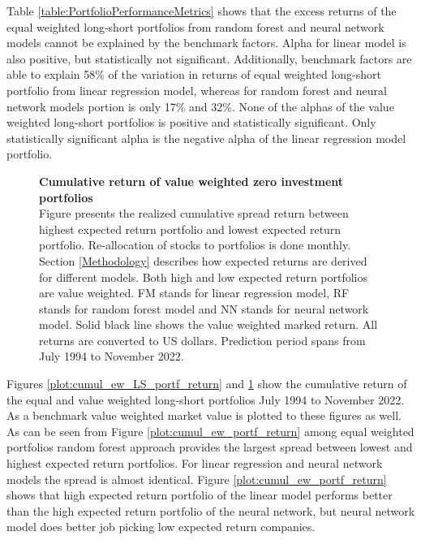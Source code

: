 \documentclass[12pt]{article}
\begin{document}
Table \ref{table:PortfolioPerformanceMetrics} shows that the excess returns of the equal weighted long-short portfolios from random forest and neural network models cannot be explained by the benchmark factors. Alpha for linear model is also positive, but statistically not significant. Additionally, benchmark factors are able to explain 58\% of the variation in returns of equal weighted long-short portfolio from linear regression model, whereas for random forest and neural network models portion is only 17\% and 32\%. None of the alphas of the value weighted long-short portfolios is positive and statistically significant. Only statistically significant alpha is the negative alpha of the linear regression model portfolio. \par

\begin{figure}[ht]
\centering
\caption[Cumulative return of value weighted zero investment portfolios]{\textbf{Cumulative return of value weighted zero investment portfolios}\\ Figure presents the realized cumulative spread return between highest expected return portfolio and lowest expected return portfolio. Re-allocation of stocks to portfolios is done monthly. Section \ref{Methodology} describes how expected returns are derived for different models. Both high and low expected return portfolios are value weighted. FM stands for linear regression model, RF stands for random forest model and NN stands for neural network model. Solid black line shows the value weighted marked return. All returns are converted to US dollars. Prediction period spans from July 1994 to November 2022.}

\label{plot:cumul_vw_LS_portf_return}
\end{figure}

Figures \ref{plot:cumul_ew_LS_portf_return} and \ref{plot:cumul_vw_LS_portf_return} show the cumulative return of the equal and value weighted long-short portfolios July 1994 to November 2022. As a benchmark value weighted market value is plotted to these figures as well. As can be seen from Figure \ref{plot:cumul_ew_portf_return} among equal weighted portfolios random forest approach provides the largest spread between lowest and highest expected return portfolios. For linear regression and neural network models the spread is almost identical. Figure \ref{plot:cumul_ew_portf_return} shows that high expected return portfolio of the linear model performs better than the high expected return portfolio of the neural network, but neural network model does better job picking low expected return companies. \par
\end{document}
